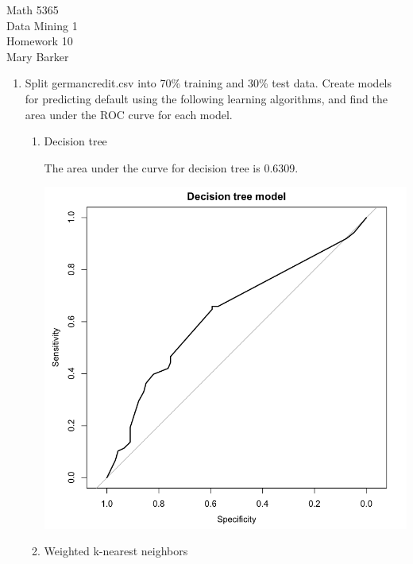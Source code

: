 \documentclass[11pt]{article}
\begin{document}
\noindent\large{Math 5365}\\
\large{Data Mining 1}\\
\large{Homework 10}\\
\large{Mary Barker}
\doublespace
\begin{enumerate}

\item Split germancredit.csv into 70\% training and 30\% test data. Create models for
      predicting default using the following learning algorithms, and find the area 
      under the ROC curve for each model.

  \begin{enumerate}
     \item Decision tree

     The area under the curve for decision tree is 0.6309. 
     \begin{center}
       \includegraphics[scale=0.35]{pix/decision_tree}
     \end{center}

     \item Weighted k-nearest neighbors


\end{enumerate}
\end{enumerate}
\end{document}
